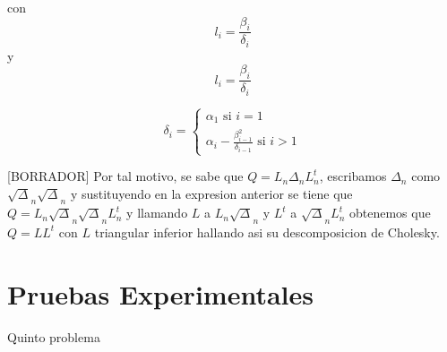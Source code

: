 \documentclass{article}
\begin{document}
    con \begin{equation} l_i = \frac{\beta_i}{\delta_i} \end{equation}
    y \begin{equation} l_i = \frac{\beta_i}{\delta_i} \end{equation}

    \begin{equation}
        \delta_i =
            \begin{cases}
                \alpha_1 \text{ si } i = 1 \\
                \alpha_i - \frac{\beta_{i-1}^2}{\delta_{i-1}} \text{ si } i>1
            \end{cases}
    \end{equation}

    [BORRADOR] Por tal motivo, se sabe que $ Q = L_n\Delta_nL_{n}^{t} $,
    escribamos $\Delta_n$ como $\sqrt\Delta_n\sqrt\Delta_n$ y sustituyendo en la expresion anterior se tiene que
    $ Q = L_n\sqrt\Delta_n\sqrt\Delta_nL_{n}^{t} $ y llamando $L$ a $L_n\sqrt\Delta_n$ y $L^t$ a $\sqrt\Delta_nL_{n}^{t}$
    obtenemos que $Q = LL^t$ con $L$ triangular inferior hallando asi su descomposicion de Cholesky.

    \subsection{}

    \subsection{}

    \section{Pruebas Experimentales}
    Quinto problema

    \subsection{}

    \subsection{}

    \subsection{}

    \subsection{}

    
\end{document}
